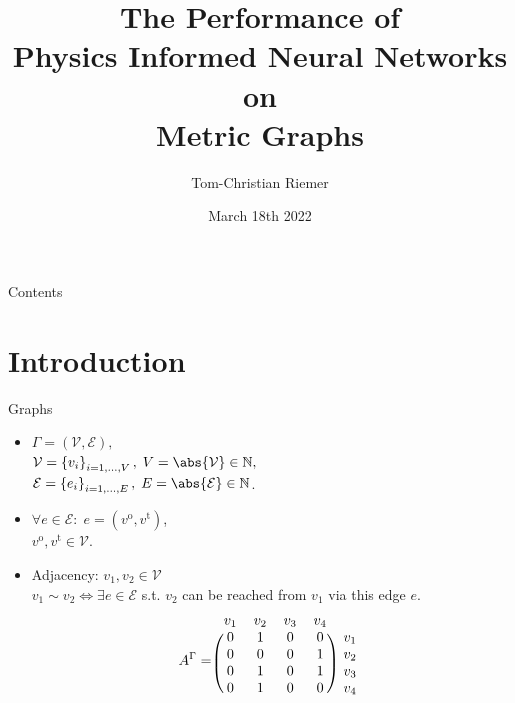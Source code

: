 \documentclass[9pt]{beamer}
\title{The Performance of \\ Physics Informed Neural Networks on \\ Metric Graphs}
\author{Tom-Christian Riemer}
\institute{TU Chemnitz}
\date{March 18th 2022}
\begin{document}
\maketitle

\begin{frame}{Contents}
  \tableofcontents
\end{frame}

\section{Introduction}

\begin{frame}{Graphs}
  \begin{minipage}{0.5\textwidth}
      \begin{itemize}
          \item $\Gamma = \left(\mathcal{V}, \mathcal{E} \right),$ \\ $\mathcal{V} = \left\{ v_i \right\}_{i = 1, \ldots, V}, \; V = \abs{\mathcal{V}} \in \mathbb{N},$ \\
          $\mathcal{E} = \left\{ e_i \right\}_{i = 1, \ldots, E}, \; E = \abs{\mathcal{E}} \in \mathbb{N}$.
          \item $\forall e \in \mathcal{E} \colon \; e = \left( v^{\operatorname{o}}, v^{\operatorname{t}} \right)$, \\
            $v^{\operatorname{o}}, v^{\operatorname{t}} \in \mathcal{V}$.
          \item Adjacency: $v_1, v_2 \in \mathcal{V}$ \\ $v_1 \sim v_2 \Leftrightarrow \exists e \in \mathcal{E}$ s.t. $v_2$ can be reached from $v_1$ via this edge $e$. \\
          \begin{equation*}
            A^{\Gamma} = 
            \begin{blockarray}{ccccc}
                v_1 & v_2 & v_3 & v_4 \\
                \begin{block}{(cccc)c}
                    0 & 1 & 0 & 0 & v_1 \\
                    0 & 0 & 0 & 1 & v_2 \\
                    0 & 1 & 0 & 1 & v_3 \\
                    0 & 1 & 0 & 0 & v_4 \\
                \end{block}
            \end{blockarray}
        \end{equation*}

\end{itemize}
\end{minipage}
\end{frame}
\end{document}
